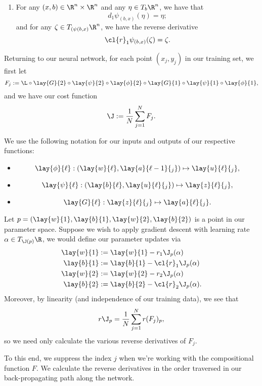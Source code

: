 \begin{enumerate}
\begin{enumerate}
		\item For any $(x,b)\in\R^n\times\R^n$ and any $\eta\in T_b\R^n$, we have that
		$$d_1\psi_{(b,x)}(\eta)=\eta;$$
		and for any $\zeta\in T_{(\psi(b,x)}\R^n$, we have the reverse derivative
		$$\cl{r}_1\psi_{(b,x)}(\zeta)=\zeta.$$
	\end{enumerate}
\end{enumerate}





Returning to our neural network, for each point $(x_j,y_j)$ in our training set, we first let
$$F_j:=\L\circ\lay{G}{2}\circ\lay{\psi}{2}\circ\lay{\phi}{2}\circ\lay{G}{1}\circ\lay{\psi}{1}\circ\lay{\phi}{1},$$
and we have our cost function
$$\J:=\frac{1}{N}\sum_{j=1}^NF_j.$$

We use the following notation for our inputs and outputs of our respective functions:
\begin{itemize}
	\item $$\lay{\phi}{\ell}:(\lay{w}{\ell},\lay{a}{\ell-1}{_j})\mapsto \lay{u}{\ell}{_j},$$
	\item $$\lay{\psi}{\ell}:(\lay{b}{\ell},\lay{u}{\ell}{_j})\mapsto\lay{z}{\ell}{_j},$$
	\item $$\lay{G}{\ell}:\lay{z}{\ell}{_j}\mapsto\lay{a}{\ell}{_j}.$$
\end{itemize}

Let $p=(\lay{w}{1},\lay{b}{1},\lay{w}{2},\lay{b}{2})$ is a point in our parameter space.  Suppose we wish to apply gradient descent with learning rate $\alpha\in T_{\J(p)}\R$, we would define our parameter updates via
\begin{align*}
	\lay{w}{1}&:=\lay{w}{1}-r_1\J_p(\alpha)\\
	\lay{b}{1}&:=\lay{b}{1}-\cl{r}_1\J_p(\alpha)\\
	\lay{w}{2}&:=\lay{w}{2}-r_2\J_p(\alpha)\\
	\lay{b}{2}&:=\lay{b}{2}-\cl{r}_2\J_p(\alpha).
\end{align*}
Moreover, by linearity (and independence of our training data), we see that
$$r\J_p=\frac{1}{N}\sum_{j=1}^Nr(F_j)_p,$$
so we need only calculate the various reverse derivatives of $F_j$.

To this end, we suppress the index $j$ when we're working with the compositional function $F$.  We calculate the reverse derivatives in the order traversed in our back-propagating path along the network.

